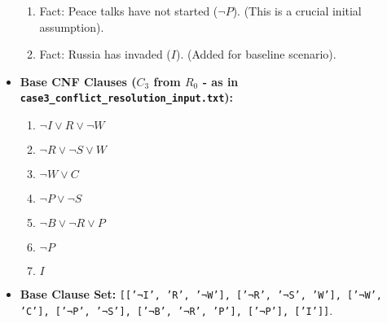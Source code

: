 \documentclass[11pt, a4paper]{article}
\begin{document}
\begin{itemize}
\begin{enumerate}
        \item Fact: Peace talks have not started ($\neg P$). (This is a crucial initial assumption).
        \item Fact: Russia has invaded ($I$). (Added for baseline scenario).
    \end{enumerate}
    \item \textbf{Base CNF Clauses ($C_3$ from $R_0$ - as in \texttt{case3\_conflict\_resolution\_input.txt}):}
    \begin{enumerate}
        \item $\neg I \vee R \vee \neg W$
        \item $\neg R \vee \neg S \vee W$
        \item $\neg W \vee C$
        \item $\neg P \vee \neg S$
        \item $\neg B \vee \neg R \vee P$
        \item $\neg P$
        \item $I$
    \end{enumerate}
    \item \textbf{Base Clause Set:} \texttt{[['¬I', 'R', '¬W'], ['¬R', '¬S', 'W'], ['¬W', 'C'], ['¬P', '¬S'], ['¬B', '¬R', 'P'], ['¬P'], ['I']]}.


\end{itemize}
\end{document}
